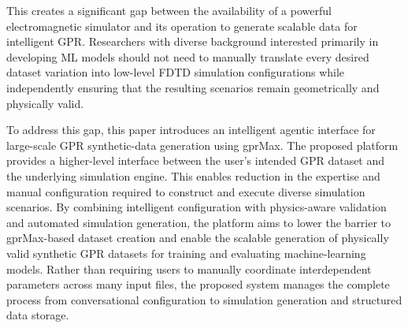 \documentclass[journal]{IEEEtran}
\begin{document}
This creates a significant gap between the availability of a powerful electromagnetic simulator and its operation to generate scalable data for intelligent GPR. Researchers with diverse background interested primarily in developing ML models should not need to manually translate every desired dataset variation into low-level FDTD simulation configurations while independently ensuring that the resulting scenarios remain geometrically and physically valid. 

To address this gap, this paper introduces an intelligent agentic interface for large-scale GPR synthetic-data generation using gprMax. The proposed platform provides a higher-level interface between the user's intended GPR dataset and the underlying simulation engine. This enables reduction in the expertise and manual configuration required to construct and execute diverse simulation scenarios. By combining intelligent configuration with physics-aware validation and automated simulation generation, the platform aims to lower the barrier to gprMax-based dataset creation and enable the scalable generation of physically valid synthetic GPR datasets for training and evaluating machine-learning models. Rather than requiring users to manually coordinate interdependent parameters across many input files, the proposed system manages the complete process from conversational configuration to simulation generation and structured data storage.








\end{document}
